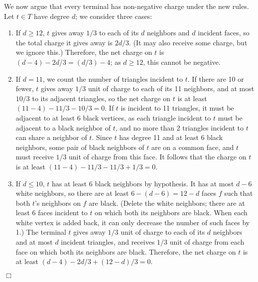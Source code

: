 \documentclass[11pt]{article}
\renewenvironment{proof}{\vspace{-0.1in}\noindent{\bf Proof:}}{\hspace*{\fill}$\Box$\par}
\begin{document}
\begin{proof}
  We now argue that every terminal has non-negative charge under the
  new rules. Let $t \in T$ have degree $d$; we consider three cases:
  \begin{enumerate}
  \item If $d \ge 12$, $t$ gives away $1/3$ to each of its $d$
    neighbors and $d$ incident faces, so the total charge it gives
    away is $2d/3$. (It may also receive some charge, but we ignore
    this.) Therefore, the net charge on $t$ is $(d - 4) - 2d/3 = (d/3)
    - 4$; as $d \ge 12$, this cannot be negative.

  \item If $d = 11$, we count the number of triangles incident to
    $t$. If there are 10 or fewer, $t$ gives away $1/3$ unit of charge
    to each of its 11 neighbors, and at most $10/3$ to its adjacent
    triangles, so the net charge on $t$ is at least $(11 - 4) - 11/3 -
    10/3 = 0$. If $t$ is incident to 11 triangles, it must be adjacent
    to at least 6 black vertices, as each triangle incident to $t$
    must be adjacent to a black neighbor of $t$, and no more than 2
    triangles incident to $t$ can share a neighbor of $t$. Since $t$
    has degree 11 and at least 6 black neighbors, some pair of black
    neighbors of $t$ are on a common face, and $t$ must receive $1/3$
    unit of charge from this face. It follows that the charge on $t$
    is at least $(11 - 4) - 11/3 - 11/3 + 1/3 = 0$. 

  \item If $d \le 10$, $t$ has at least 6 black neighbors by
    hypothesis. It has at most $d - 6$ white neighbors, so there are
    at least $6 - (d - 6) = 12 - d$ faces $f$ such that both $t$'s
    neighbors on $f$ are black. (Delete the white neighbors; there are
    at least $6$ faces incident to $t$ on which both its neighbors are
    black. When each white vertex is added back, it can only decrease
    the number of such faces by 1.) The terminal $t$ gives away $1/3$
    unit of charge to each of its $d$ neighbors and at most $d$
    incident triangles, and receives $1/3$ unit of charge from each
    face on which both its neighbors are black. Therefore, the net
    charge on $t$ is at least $(d - 4) - 2d/3 + (12 - d)/3 = 0$.
  \end{enumerate}
  \vspace{-0.35in}
\end{proof}
\end{document}
